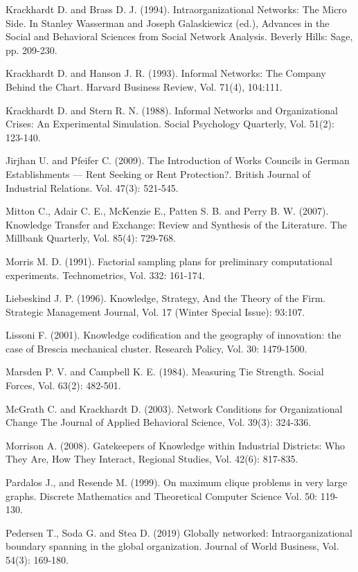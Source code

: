 \documentclass{article}
\begin{document}
\begin{hangparas}{.25in}{1}
Krackhardt D. and Brass D. J. (1994). Intraorganizational Networks: The Micro Side. In Stanley Wasserman and Joseph Galaskiewicz (ed.), Advances in the Social and Behavioral Sciences from Social Network Analysis. Beverly Hills: Sage, pp. 209-230.

Krackhardt D. and Hanson J. R. (1993). Informal Networks: The Company Behind the Chart. Harvard Business Review, Vol. 71(4), 104:111.

Krackhardt D. and Stern R. N. (1988). Informal Networks and Organizational Crises: An Experimental Simulation. Social Psychology Quarterly, Vol. 51(2): 123-140.

Jirjhan U. and Pfeifer C. (2009). The Introduction of Works Councils in German Establishments — Rent Seeking or Rent Protection?. British Journal of Industrial Relations. Vol. 47(3): 521-545.

Mitton C., Adair C. E., McKenzie E., Patten S. B. and Perry B. W. (2007). Knowledge Transfer and Exchange: Review and Synthesis of the Literature. The Millbank Quarterly, Vol. 85(4): 729-768.

Morris M. D. (1991). Factorial sampling plans for preliminary computational experiments. Technometrics, Vol. 332: 161-174.

Liebeskind J. P. (1996). Knowledge, Strategy, And the Theory of the Firm. Strategic Management Journal, Vol. 17 (Winter Special Issue): 93:107.

Lissoni F. (2001). Knowledge codification and the geography of innovation: the case of Brescia mechanical cluster. Research Policy, Vol. 30: 1479-1500.

Marsden P. V. and Campbell K. E. (1984). Measuring Tie Strength. Social Forces, Vol. 63(2): 482-501.

McGrath C. and Krackhardt D. (2003). Network Conditions for Organizational Change The Journal of Applied Behavioral Science, Vol. 39(3): 324-336.

Morrison A. (2008). Gatekeepers of Knowledge within Industrial Districts: Who They Are, How They Interact, Regional Studies, Vol. 42(6): 817-835.

Pardalos J., and Resende M. (1999). On maximum clique problems in very large graphs. Discrete Mathematics and Theoretical Computer Science Vol. 50: 119-130.

Pedersen T., Soda G. and Stea D. (2019) Globally networked: Intraorganizational boundary spanning in the global organization. Journal of World Business, Vol. 54(3): 169-180.


\end{hangparas}
\end{document}
